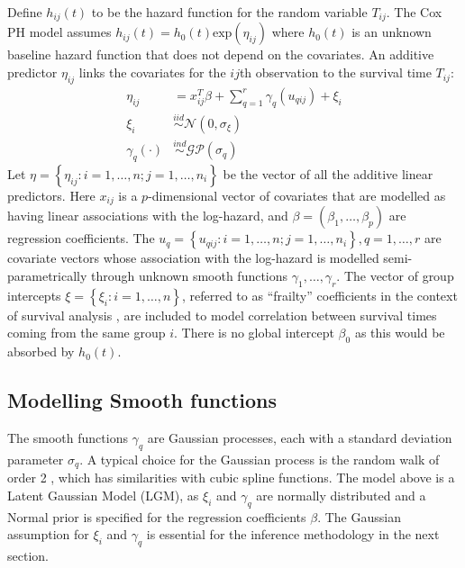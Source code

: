 \documentclass[serif,10pt]{wiley-article}
\begin{document}
Define $h_{ij}(t)$ to be the hazard function for the random variable $T_{ij}$. The Cox PH model assumes $h_{ij}(t) = h_0(t)\text{exp}(\eta_{ij})$ where $h_0(t)$ is an unknown baseline hazard function that does not depend on the covariates. An additive predictor $\eta_{ij}$ links the covariates for the $ij$th observation to the survival time $T_{ij}$:
\begin{equation}\begin{aligned}\label{eqn:eta}
\eta_{ij} &=x_{ij}^{T}\beta+\sum_{q=1}^{r} \gamma_q(u_{qij}) +\xi_{i} \\
\xi_i &\overset{iid}{\sim} \mathcal{N}(0,\sigma_{\xi}) \\
\gamma_{q}(\cdot) &\overset{ind}{\sim} \mathcal{GP}(\sigma_q)
\end{aligned}\end{equation}
Let $\eta = \left\{ \eta_{ij}: i = 1,\ldots,n; j = 1,\ldots,n_{i}\right\}$ be the vector of all the additive linear predictors. Here $x_{ij}$ is a $p$-dimensional vector of covariates that are modelled as having linear associations with the log-hazard, and $\beta = (\beta_{1},\ldots,\beta_{p})$ are regression coefficients. The $u_{q} = \left\{u_{qij}: i = 1,\ldots,n; j = 1,\ldots,n_{i} \right\}, q = 1,\ldots,r$ are covariate vectors whose association with the log-hazard is modelled semi-parametrically through unknown smooth functions $\gamma_1,\ldots,\gamma_r$. The vector of group intercepts $\xi = \left\{ \xi_{i}: i=1,\ldots,n\right\}$, referred to as ``frailty'' coefficients in the context of survival analysis \cite{frailty}, are included to model correlation between survival times coming from the same group $i$. There is no global intercept $\beta_{0}$ as this would be absorbed by $h_{0}(t)$.

\subsection{Modelling Smooth functions}\label{subsec:smooth}
The smooth functions $\gamma_q$ are Gaussian processes, each with a standard deviation parameter $\sigma_q$. A typical choice
for the Gaussian process is the random walk of order 2 \cite{rw2}, which has similarities with cubic spline functions.
The model above is a Latent Gaussian Model (LGM), as $\xi_i$ and $\gamma_q$ are normally distributed and a Normal
prior is specified for the regression coefficients $\beta$. The Gaussian assumption for $\xi_i$ and $\gamma_q$ is essential for the inference methodology in the next section.
\end{document}
